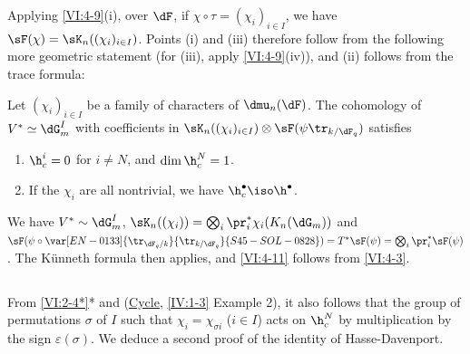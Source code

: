 Applying \ref{VI:4-9}(i), over $\dF$, if $\chi\circ \tau=(\chi_i)_{i\in I}$, 
we have $\sF(\chi) = \sK_n((\chi_i)_{i\in I})$. Points (i) and (iii) 
therefore follow from the following more geometric statement (for (iii), 
apply \ref{VI:4-9}(iv)), and (ii) follows from the trace formula: 





\begin{proposition_}\label{VI:4-11}
Let $(\chi_i)_{i\in I}$ be a family of characters of $\dmu_n(\dF)$. The 
cohomology of $V^\ast\simeq \dG_m^I$ with coefficients in 
$\sK_n((\chi_i)_{i\in I})\otimes \sF(\psi\tr_{k/\dF_q})$ satisfies 
\begin{enumerate}[\indent (i)]
  \item $\h_c^i{}=0$ for $i\ne N$, and $\dim \h_c^N{} = 1$. 
  \item If the $\chi_i$ are all nontrivial, we have 
    $\h_c^\bullet{}\iso \h^\bullet$. 
\end{enumerate}
\end{proposition_}

We have $V^\ast\sim \dG_m^I$, 
$\sK_n((\chi_i)) = \bigotimes_i \pr_i^\ast \chi_i(K_n(\dG_m))$ and 
$\sF(\psi\circ \var[EN-0133]{\tr_{\dF_q/k}}{\tr_{k/\dF_q}}{S45-SOL-0828})=T^\ast \sF(\psi) = \bigotimes_i \pr_i^\ast \sF(\psi)$. 
The K\"unneth formula then applies, and \ref{VI:4-11} follows from 
\ref{VI:4-3}. 





\subsection{}\label{VI:4-12}

From \ref{VI:2-4*}* and (\hyperref[IV]{Cycle}, \ref{IV:1-3} Example 2), it also follows 
that the group of permutations $\sigma$ of $I$ such that 
$\chi_i = \chi_{\sigma i}$ ($i\in I$) acts on $\h_c^N$ by multiplication by 
the sign $\varepsilon(\sigma)$. We deduce a second proof 
of the identity of Hasse-Davenport. 

